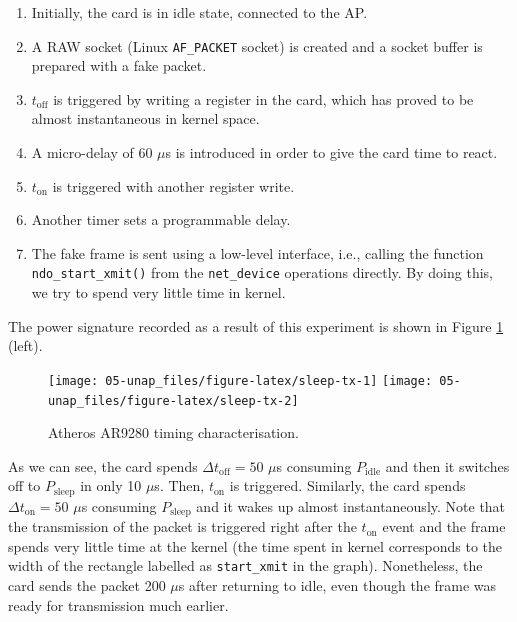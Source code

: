 \documentclass[twoside,nohyper]{tufte-book}
\providecommand{\tightlist}{%
  \setlength{\itemsep}{0pt}\setlength{\parskip}{0pt}}
\theoremstyle{definition}
\theoremstyle{definition}
\theoremstyle{definition}
\theoremstyle{remark}
\begin{document}
\begin{enumerate}
\def\labelenumi{\arabic{enumi}.}
\setcounter{enumi}{-1}
\tightlist
\item
  Initially, the card is in idle state, connected to the AP.
\item
  A RAW socket (Linux \texttt{AF\_PACKET} socket) is created and a
  socket buffer is prepared with a fake packet.
\item
  \(t_\mathrm{off}\) is triggered by writing a register in the card,
  which has proved to be almost instantaneous in kernel space.
\item
  A micro-delay of 60 \(\mu\)s is introduced in order to give the card
  time to react.
\item
  \(t_\mathrm{on}\) is triggered with another register write.
\item
  Another timer sets a programmable delay.
\item
  The fake frame is sent using a low-level interface, i.e., calling the
  function \texttt{ndo\_start\_xmit()} from the \texttt{net\_device}
  operations directly. By doing this, we try to spend very little time
  in kernel.
\end{enumerate}

The power signature recorded as a result of this experiment is shown in
Figure \ref{fig:sleep-tx} (left).



\begin{figure}

{\centering \texttt{[image: 05-unap\_files/figure-latex/sleep-tx-1]} \texttt{[image: 05-unap\_files/figure-latex/sleep-tx-2]} 

}

\caption[Atheros AR9280 timing characterisation.]{Atheros AR9280 timing characterisation.}\label{fig:sleep-tx}
\end{figure}

As we can see, the card spends \(\Delta t_\mathrm{off} = 50\) \(\mu\)s
consuming \(P_\mathrm{idle}\) and then it switches off to
\(P_\mathrm{sleep}\) in only 10 \(\mu\)s. Then, \(t_\mathrm{on}\) is
triggered. Similarly, the card spends \(\Delta t_\mathrm{on} = 50\)
\(\mu\)s consuming \(P_\mathrm{sleep}\) and it wakes up almost
instantaneously. Note that the transmission of the packet is triggered
right after the \(t_\mathrm{on}\) event and the frame spends very little
time at the kernel (the time spent in kernel corresponds to the width of
the rectangle labelled as \texttt{start\_xmit} in the graph).
Nonetheless, the card sends the packet 200 \(\mu\)s after returning to
idle, even though the frame was ready for transmission much earlier.
\end{document}
